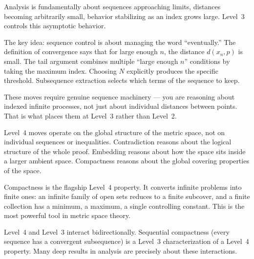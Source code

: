 \begin{remark}
Analysis is fundamentally about sequences approaching limits, distances
becoming arbitrarily small, behavior stabilizing as an index grows large.
Level~3 controls this asymptotic behavior.

The key idea: sequence control is about managing the word ``eventually.''
The definition of convergence says that for large enough $n$, the
distance $d(x_n, p)$ is small. The tail argument combines multiple
``large enough $n$'' conditions by taking the maximum index. Choosing $N$
explicitly produces the specific threshold. Subsequence extraction selects
which terms of the sequence to keep.

These moves require genuine sequence machinery --- you are reasoning
about indexed infinite processes, not just about individual distances
between points. That is what places them at Level~3 rather than Level~2.
\end{remark}

\begin{remark}
Level~4 moves operate on the global structure of the metric space, not
on individual sequences or inequalities. Contradiction reasons about
the logical structure of the whole proof. Embedding reasons about how
the space sits inside a larger ambient space. Compactness reasons about
the global covering properties of the space.

Compactness is the flagship Level~4 property. It converts infinite
problems into finite ones: an infinite family of open sets reduces to
a finite subcover, and a finite collection has a minimum, a maximum, a
single controlling constant. This is the most powerful tool in metric
space theory.

Level~4 and Level~3 interact bidirectionally. Sequential compactness
(every sequence has a convergent subsequence) is a Level~3
characterization of a Level~4 property. Many deep results in analysis
are precisely about these interactions.
\end{remark}

